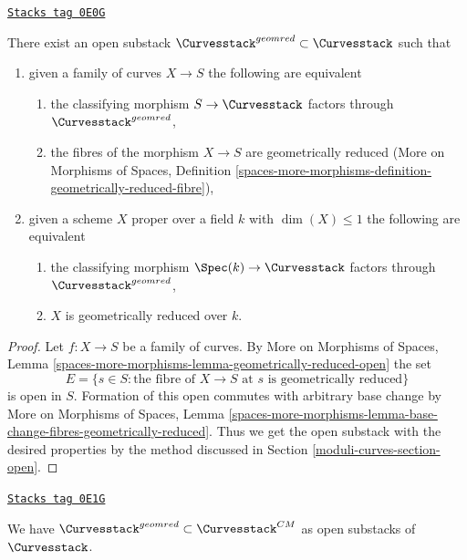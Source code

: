 \begin{lemma}
\label{moduli-curves-lemma-geometrically-reduced-curves}
\href{https://stacks.math.columbia.edu/tag/0E0G}{\texttt{Stacks tag 0E0G}}

There exist an open substack $\Curvesstack^{geomred} \subset \Curvesstack$
such that
\begin{enumerate}
\item given a family of curves $X \to S$ the following are equivalent
\begin{enumerate}
\item the classifying morphism $S \to \Curvesstack$ factors
through $\Curvesstack^{geomred}$,
\item the fibres of the morphism $X \to S$ are geometrically reduced
(More on Morphisms of Spaces, Definition
\ref{spaces-more-morphisms-definition-geometrically-reduced-fibre}),
\end{enumerate}
\item given a scheme $X$ proper over a field $k$ with $\dim(X) \leq 1$
the following are equivalent
\begin{enumerate}
\item the classifying morphism $\Spec(k) \to \Curvesstack$ factors
through $\Curvesstack^{geomred}$,
\item $X$ is geometrically reduced over $k$.
\end{enumerate}
\end{enumerate}
\end{lemma}

\begin{proof}
Let $f : X \to S$ be a family of curves. By
More on Morphisms of Spaces, Lemma
\ref{spaces-more-morphisms-lemma-geometrically-reduced-open}
the set
$$
E = \{s \in S : \text{the fibre of }X \to S\text{ at }s
\text{ is geometrically reduced}\}
$$
is open in $S$. Formation of this open commutes with arbitrary
base change by
More on Morphisms of Spaces, Lemma
\ref{spaces-more-morphisms-lemma-base-change-fibres-geometrically-reduced}.
Thus we get the open substack with the desired properties
by the method discussed in Section \ref{moduli-curves-section-open}.
\end{proof}

\begin{lemma}[Geomred in CM]
\label{moduli-curves-lemma-geomred-in-CM}
\href{https://stacks.math.columbia.edu/tag/0E1G}{\texttt{Stacks tag 0E1G}}

We have $\Curvesstack^{geomred} \subset \Curvesstack^{CM}$
as open substacks of $\Curvesstack$.
\end{lemma}

